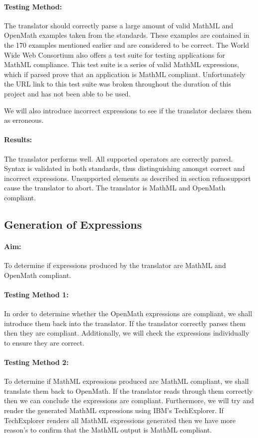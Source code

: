 \paragraph{Testing Method:} The translator should correctly parse a large
amount of valid MathML and OpenMath examples taken from the standards.
These examples are contained in the 170 examples mentioned earlier and are considered to be correct. The
World Wide Web Consortium also offers a test suite for testing
applications for MathML compliance. This test suite is a series of valid
MathML expressions, which if parsed prove that an application is MathML
compliant. Unfortunately the URL link to this test suite was broken
throughout the duration of this project and has not been able to be used.

We will also introduce incorrect expressions to see if the translator
declares them as erroneous.

\paragraph{Results:} The translator performs well. All supported
operators are correctly parsed. Syntax is validated in both standards, thus distinguishing amongst correct and incorrect expressions.
Unsupported elements as described in section ref{nosupport} cause the
translator to abort. The translator is MathML and OpenMath compliant.

\subsection{Generation of Expressions}

\paragraph{Aim:} To determine if expressions produced by the translator
are MathML and OpenMath compliant.

\paragraph{Testing Method 1:} In order to determine whether the OpenMath
expressions are compliant, we shall introduce them back into the
translator. If the translator correctly parses them then they are
compliant.  Additionally, we will check the expressions individually to
ensure they are correct.

\paragraph{Testing Method 2:} To determine if MathML expressions produced
are MathML compliant, we shall translate them back to OpenMath. If the
translator reads through them correctly then we can conclude the
expressions are compliant.  Furthermore, we will try and render the
generated MathML expressions using IBM's TechExplorer. If TechExplorer
renders all MathML expressions generated then we have more reason's to
confirm that the MathML output is MathML compliant. 

